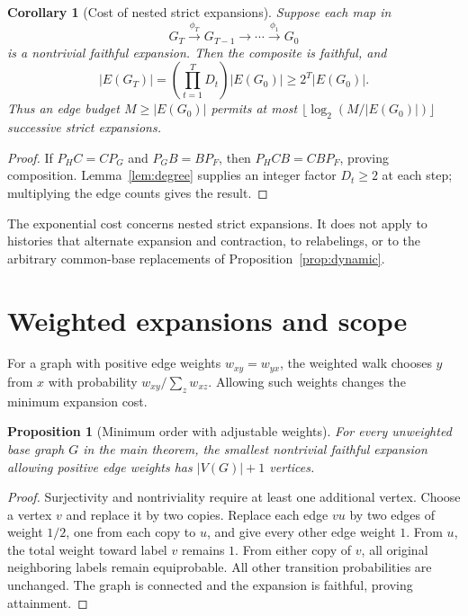 \documentclass[11pt]{article}
\newtheorem{proposition}[theorem]{Proposition}
\newtheorem{corollary}[theorem]{Corollary}
\theoremstyle{definition}
\numberwithin{equation}{section}
\newcommand{\V}{V}
\newcommand{\E}{E}
\begin{document}
\begin{corollary}[Cost of nested strict expansions]\label{cor:history}
Suppose each map in
\[
 G_T\xrightarrow{\phi_T}G_{T-1}\longrightarrow\cdots
       \xrightarrow{\phi_1}G_0
\]
is a nontrivial faithful expansion. Then the composite is faithful, and
\[
 |\E(G_T)|=\left(\prod_{t=1}^T D_t\right)|\E(G_0)|
       \ge2^T|\E(G_0)|.
\]
Thus an edge budget $M\ge|\E(G_0)|$ permits at most
$\lfloor\log_2(M/|\E(G_0)|)\rfloor$ successive strict expansions.
\end{corollary}
\begin{proof}
If $P_HC=CP_G$ and $P_GB=BP_F$, then $P_HCB=CBP_F$, proving composition.
Lemma~\ref{lem:degree} supplies an integer factor $D_t\ge2$ at each step;
multiplying the edge counts gives the result.
\end{proof}

The exponential cost concerns nested strict expansions. It does not apply
to histories that alternate expansion and contraction, to relabelings, or
to the arbitrary common-base replacements of Proposition~\ref{prop:dynamic}.

\section{Weighted expansions and scope}\label{sec:weights}

For a graph with positive edge weights $w_{xy}=w_{yx}$, the weighted walk
chooses $y$ from $x$ with probability $w_{xy}/\sum_z w_{xz}$. Allowing such
weights changes the minimum expansion cost.

\begin{proposition}[Minimum order with adjustable weights]
For every unweighted base graph $G$ in the main theorem, the smallest
nontrivial faithful expansion allowing positive edge weights has
$|\V(G)|+1$ vertices.
\end{proposition}
\begin{proof}
Surjectivity and nontriviality require at least one additional vertex.
Choose a vertex $v$ and replace it by two copies. Replace each edge $vu$
by two edges of weight $1/2$, one from each copy to $u$, and give every
other edge weight $1$. From $u$, the total weight toward label $v$ remains
$1$. From either copy of $v$, all original neighboring labels remain
equiprobable. All other transition probabilities are unchanged. The graph
is connected and the expansion is faithful, proving attainment.
\end{proof}
\end{document}
